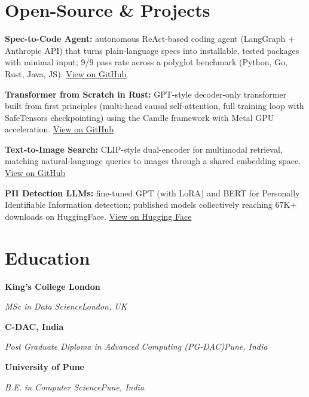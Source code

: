 \documentclass[10pt,a4paper]{article}
\newcommand{\entry}[4]{%
  {\color{company}\bfseries #1}\hfill {\color{muted}#2}\par
  \vspace{1pt}
  {\itshape #3}\hfill {\color{muted}\itshape #4}\par
  \vspace{3pt}%
}
\begin{document}
\section{Open-Source \& Projects}
\begin{tight}
  \item \textbf{Spec-to-Code Agent:} autonomous ReAct-based coding agent (LangGraph + Anthropic API) that turns plain-language specs into installable, tested packages with minimal input; 9/9 pass rate across a polyglot benchmark (Python, Go, Rust, Java, JS). \href{https://github.com/abhijeetscode/Spec-to-Code-Agent}{View on GitHub}
  \item \textbf{Transformer from Scratch in Rust:} GPT-style decoder-only transformer built from first principles (multi-head causal self-attention, full training loop with SafeTensors checkpointing) using the Candle framework with Metal GPU acceleration. \href{https://github.com/abhijeetscode/transformer-rust}{View on GitHub}
  \item \textbf{Text-to-Image Search:} CLIP-style dual-encoder for multimodal retrieval, matching natural-language queries to images through a shared embedding space. \href{https://github.com/abhijeetscode/text-to-image-search}{View on GitHub}
  \item \textbf{PII Detection LLMs:} fine-tuned GPT (with LoRA) and BERT for Personally Identifiable Information detection; published models collectively reaching 67K+ downloads on HuggingFace. \href{https://huggingface.co/ab-ai/pii_model}{View on Hugging Face}
\end{tight}

\section{Education}
\entry{King's College London}{}{MSc in Data Science}{London, UK}
\vspace{-3pt}
\entry{C-DAC, India}{}{Post Graduate Diploma in Advanced Computing (PG-DAC)}{Pune, India}
\vspace{-3pt}
\entry{University of Pune}{}{B.E. in Computer Science}{Pune, India}
\end{document}
